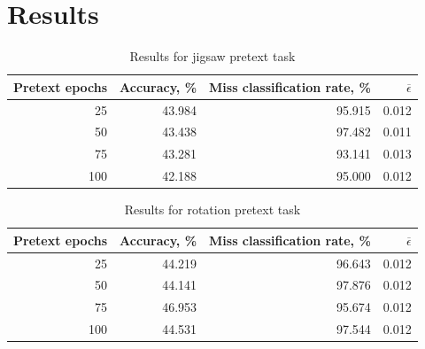 \section{Results}

\begin{table}[h]
    \begin{tabular}{|r|r|r|r|}
        \hline
        Pretext epochs & Accuracy, \% & Miss classification rate, \% & $\overline{\epsilon}$ \\
        \hline
        25             & 43.984       & 95.915                       & 0.012                 \\
        50             & 43.438       & 97.482                       & 0.011                 \\
        \rowcolor{yellow}
        75             & 43.281       & 93.141                       & 0.013                 \\
        100            & 42.188       & 95.000                       & 0.012                 \\
        \hline
    \end{tabular}
    \caption{\label{tab:table-1}Results for jigsaw pretext task}
\end{table}



\begin{table}[h]
    \begin{tabular}{|r|r|r|r|}
        \hline
        Pretext epochs & Accuracy, \% & Miss classification rate, \% & $\overline{\epsilon}$ \\
        \hline
        25             & 44.219       & 96.643                       & 0.012                 \\
        50             & 44.141       & 97.876                       & 0.012                 \\
        \rowcolor{yellow}
        75             & 46.953       & 95.674                       & 0.012                 \\
        100            & 44.531       & 97.544                       & 0.012                 \\
        \hline
    \end{tabular}
    \caption{\label{tab:table-2}Results for rotation pretext task}
\end{table}

